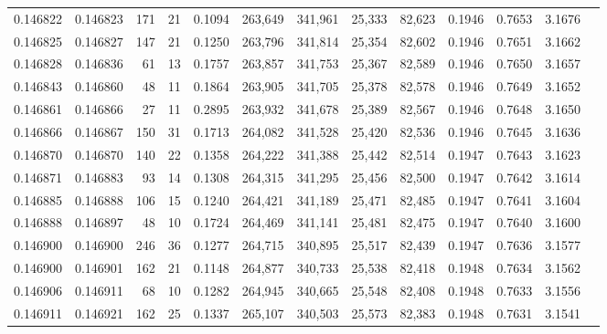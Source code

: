 \begin{tabular}{rrrrrrrrrrrrr}
0.146822 & 0.146823 &   171 &  21 &                                     0.1094 & 263,649 & 341,961 &  25,333 &  82,623 & 0.1946 & 0.7653 & 3.1676 \\
0.146825 & 0.146827 &   147 &  21 &                                     0.1250 & 263,796 & 341,814 &  25,354 &  82,602 & 0.1946 & 0.7651 & 3.1662 \\
0.146828 & 0.146836 &    61 &  13 &                                     0.1757 & 263,857 & 341,753 &  25,367 &  82,589 & 0.1946 & 0.7650 & 3.1657 \\
0.146843 & 0.146860 &    48 &  11 &                                     0.1864 & 263,905 & 341,705 &  25,378 &  82,578 & 0.1946 & 0.7649 & 3.1652 \\
0.146861 & 0.146866 &    27 &  11 &                                     0.2895 & 263,932 & 341,678 &  25,389 &  82,567 & 0.1946 & 0.7648 & 3.1650 \\
0.146866 & 0.146867 &   150 &  31 &                                     0.1713 & 264,082 & 341,528 &  25,420 &  82,536 & 0.1946 & 0.7645 & 3.1636 \\
0.146870 & 0.146870 &   140 &  22 &                                     0.1358 & 264,222 & 341,388 &  25,442 &  82,514 & 0.1947 & 0.7643 & 3.1623 \\
0.146871 & 0.146883 &    93 &  14 &                                     0.1308 & 264,315 & 341,295 &  25,456 &  82,500 & 0.1947 & 0.7642 & 3.1614 \\
0.146885 & 0.146888 &   106 &  15 &                                     0.1240 & 264,421 & 341,189 &  25,471 &  82,485 & 0.1947 & 0.7641 & 3.1604 \\
0.146888 & 0.146897 &    48 &  10 &                                     0.1724 & 264,469 & 341,141 &  25,481 &  82,475 & 0.1947 & 0.7640 & 3.1600 \\
0.146900 & 0.146900 &   246 &  36 &                                     0.1277 & 264,715 & 340,895 &  25,517 &  82,439 & 0.1947 & 0.7636 & 3.1577 \\
0.146900 & 0.146901 &   162 &  21 &                                     0.1148 & 264,877 & 340,733 &  25,538 &  82,418 & 0.1948 & 0.7634 & 3.1562 \\
0.146906 & 0.146911 &    68 &  10 &                                     0.1282 & 264,945 & 340,665 &  25,548 &  82,408 & 0.1948 & 0.7633 & 3.1556 \\
0.146911 & 0.146921 &   162 &  25 &                                     0.1337 & 265,107 & 340,503 &  25,573 &  82,383 & 0.1948 & 0.7631 & 3.1541 \\

\end{tabular}
